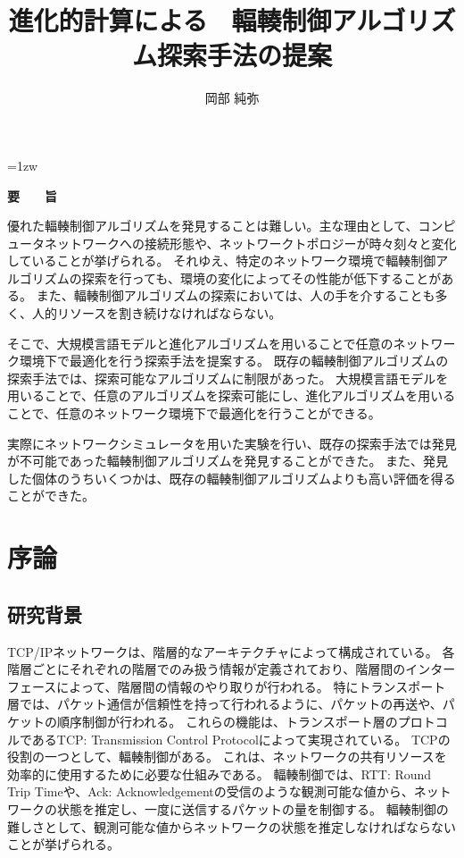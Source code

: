 \documentclass[a4paper,11pt]{jreport}
\title{進化的計算による \ 輻輳制御アルゴリズム探索手法の提案}
\author{岡部 純弥}
\begin{document}
\maketitle
\thispagestyle{empty}
\newpage

\thispagestyle{empty}
\vspace*{20pt plus 1fil}
\parindent=1zw
\noindent
\begin{center}
{\Large \bf 要　　旨}
\vspace{2cm}
\end{center}

優れた輻輳制御アルゴリズムを発見することは難しい。主な理由として、コンピュータネットワークへの接続形態や、ネットワークトポロジーが時々刻々と変化していることが挙げられる。
それゆえ、特定のネットワーク環境で輻輳制御アルゴリズムの探索を行っても、環境の変化によってその性能が低下することがある。
また、輻輳制御アルゴリズムの探索においては、人の手を介することも多く、人的リソースを割き続けなければならない。

そこで、大規模言語モデルと進化アルゴリズムを用いることで任意のネットワーク環境下で最適化を行う探索手法を提案する。
既存の輻輳制御アルゴリズムの探索手法では、探索可能なアルゴリズムに制限があった。
大規模言語モデルを用いることで、任意のアルゴリズムを探索可能にし、進化アルゴリズムを用いることで、任意のネットワーク環境下で最適化を行うことができる。

実際にネットワークシミュレータを用いた実験を行い、既存の探索手法では発見が不可能であった輻輳制御アルゴリズムを発見することができた。
また、発見した個体のうちいくつかは、既存の輻輳制御アルゴリズムよりも高い評価を得ることができた。

\par
\vspace{0pt plus 1fil}
\newpage

\tableofcontents
\listoffigures

\pagebreak \setcounter{page}{1}

\chapter{序論}

\section{研究背景}

TCP/IPネットワークは、階層的なアーキテクチャによって構成されている。
各階層ごとにそれぞれの階層でのみ扱う情報が定義されており、階層間のインターフェースによって、階層間の情報のやり取りが行われる。
特にトランスポート層では、パケット通信が信頼性を持って行われるように、パケットの再送や、パケットの順序制御が行われる。
これらの機能は、トランスポート層のプロトコルであるTCP: Transmission Control Protocolによって実現されている。
TCPの役割の一つとして、輻輳制御がある。
これは、ネットワークの共有リソースを効率的に使用するために必要な仕組みである。
輻輳制御では、RTT: Round Trip Timeや、Ack: Acknowledgementの受信のような観測可能な値から、ネットワークの状態を推定し、一度に送信するパケットの量を制御する。
輻輳制御の難しさとして、観測可能な値からネットワークの状態を推定しなければならないことが挙げられる。
\end{document}
